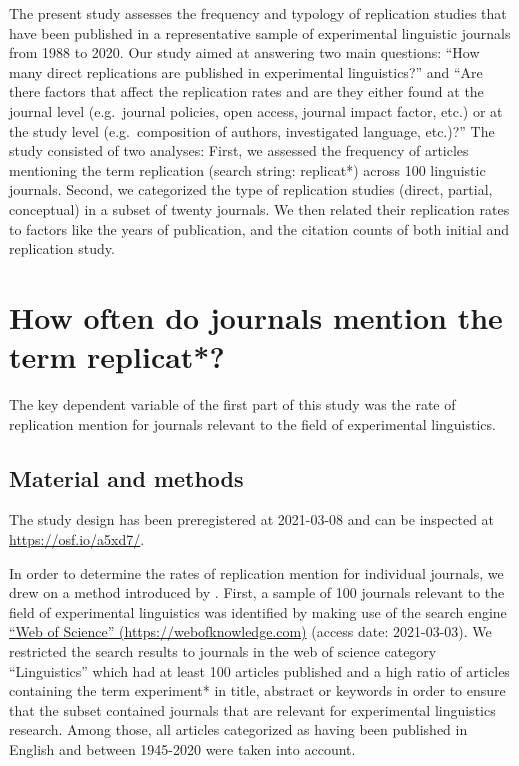 \documentclass[cm,linguex]{glossa}
\begin{document}
The present study assesses the frequency and typology of replication studies that have been published in a representative sample of experimental linguistic journals from 1988 to 2020.
Our study aimed at answering two main questions: ``How many direct replications are published in experimental linguistics?'' and ``Are there factors that affect the replication rates and are they either found at the journal level (e.g.~journal policies, open access, journal impact factor, etc.) or at the study level (e.g.~composition of authors, investigated language, etc.)?''
The study consisted of two analyses:
First, we assessed the frequency of articles mentioning the term replication (search string: replicat*) across 100 linguistic journals.
Second, we categorized the type of replication studies (direct, partial, conceptual) in a subset of twenty journals. We then related their replication rates to factors like the years of publication, and the citation counts of both initial and replication study.

\hypertarget{how-often-do-journals-mention-the-term-replicat}{%
\section{How often do journals mention the term replicat*?}\label{how-often-do-journals-mention-the-term-replicat}}

The key dependent variable of the first part of this study was the rate of replication mention for journals relevant to the field of experimental linguistics.

\hypertarget{material-and-methods}{%
\subsection{Material and methods}\label{material-and-methods}}

The study design has been preregistered at 2021-03-08 and can be inspected at \url{https://osf.io/a5xd7/}.

In order to determine the rates of replication mention for individual journals, we drew on a method introduced by \citet{makel_replications_2012}.
First, a sample of 100 journals relevant to the field of experimental linguistics was identified by making use of the search engine \href{https://webofknowledge.com}{``Web of Science'' (https://webofknowledge.com)} (access date: 2021-03-03). We restricted the search results to journals in the web of science category ``Linguistics'' which had at least 100 articles published and a high ratio of articles containing the term experiment* in title, abstract or keywords in order to ensure that the subset contained journals that are relevant for experimental linguistics research. Among those, all articles categorized as having been published in English and between 1945-2020 were taken into account.
\end{document}
